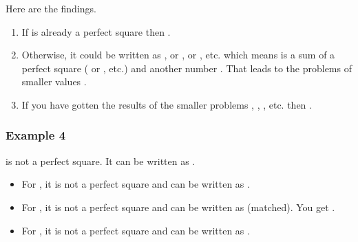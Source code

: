 \documentclass[letterpaper,12pt,english]{book}
\begin{document}
\sphinxAtStartPar
Here are the findings.
\begin{enumerate}
%
\item {} 
\sphinxAtStartPar
If  is already a perfect square then .

\item {} 
\sphinxAtStartPar
Otherwise, it could be written as , or , or , etc. which means  is a sum of a perfect square ( or , etc.) and another number . That leads to the problems  of smaller values .

\item {} 
\sphinxAtStartPar
If you have gotten the results of the smaller problems , , , etc. then .

\end{enumerate}


\subsubsection{Example 4}
\label{\detokenize{Mathematics/09_MTH_279_Perfect_Squares:id1}}
\sphinxAtStartPar
{} is not a perfect square. It can be written as .
\begin{itemize}
\item {} 
\sphinxAtStartPar
For , it is not a perfect square and can be written as .

\item {} 
\sphinxAtStartPar
For , it is not a perfect square and can be written as  (matched). You get .

\item {} 
\sphinxAtStartPar
For , it is not a perfect square and can be written as .

\end{itemize}
\end{document}
